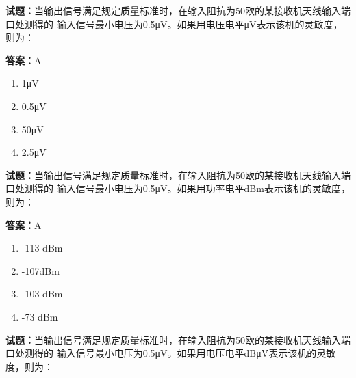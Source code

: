 \documentclass{ctexbook}
\begin{document}




\vspace{1em}

\textbf{试题：}当输出信号满足规定质量标准时，在输入阻抗为50欧的某接收机天线输入端口处测得的
输入信号最小电压为0.5μV。如果用电压电平μV表示该机的灵敏度，则为： 

\textbf{答案：}A 

\begin{enumerate}[leftmargin=3em]
  \item 1μV 

  \item 0.5μV 

  \item 50μV 

  \item 2.5μV 

\end{enumerate}





\vspace{1em}

\textbf{试题：}当输出信号满足规定质量标准时，在输入阻抗为50欧的某接收机天线输入端口处测得的
输入信号最小电压为0.5μV。如果用功率电平dBm表示该机的灵敏度，则为： 

\textbf{答案：}A 

\begin{enumerate}[leftmargin=3em]
  \item -113 dBm 

  \item -107dBm 


  \item -103 dBm 

  \item -73 dBm 

\end{enumerate}





\vspace{1em}

\textbf{试题：}当输出信号满足规定质量标准时，在输入阻抗为50欧的某接收机天线输入端口处测得的
输入信号最小电压为0.5μV。如果用电压电平dBμV表示该机的灵敏度，则为： 
\end{document}

